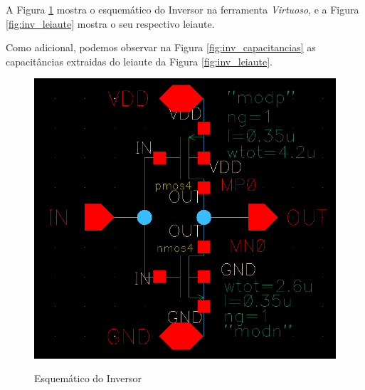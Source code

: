 \documentclass{iiufrgs}
\newcommand{\virtuoso}{\textit{Virtuoso}}
\begin{document}
A Figura \ref{fig:inv_esquematico} mostra o esquemático do Inversor na ferramenta \virtuoso, e a Figura \ref{fig:inv_leiaute} mostra o seu respectivo leiaute.

Como adicional, podemos observar na Figura \ref{fig:inv_capacitancias} as capacitâncias extraidas do leiaute da Figura \ref{fig:inv_leiaute}.

\begin{figure}[htbp]
    \centering
    \caption{Esquemático do Inversor}
    \includegraphics[scale=0.6]{images/schem_inv.png}
    \label{fig:inv_esquematico}
\end{figure}
\end{document}
